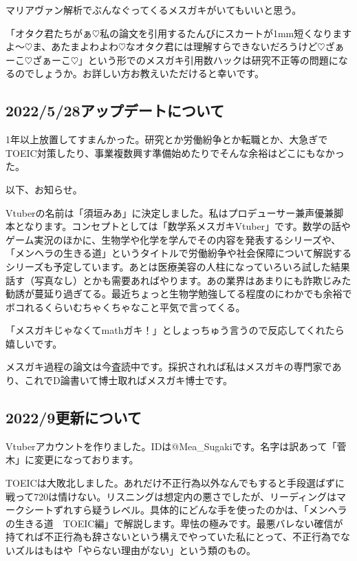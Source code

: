\documentclass{jsarticle}
\begin{document}
マリアヴァン解析でぶんなぐってくるメスガキがいてもいいと思う。

「オタク君たちがぁ$\heartsuit$私の論文を引用するたんびにスカートが1mm短くなりますよ～$\heartsuit$ま、あたまよわよわ$\heartsuit$なオタク君には理解すらできないだろうけど$\heartsuit$ざぁーこ$\heartsuit$ざぁーこ$\heartsuit$」という形でのメスガキ引用数ハックは研究不正等の問題になるのでしょうか。お詳しい方お教えいただけると幸いです。


\subsection{2022/5/28アップデートについて}

1年以上放置してすまんかった。研究とか労働紛争とか転職とか、大急ぎでTOEIC対策したり、事業複数興す準備始めたりでそんな余裕はどこにもなかった。

以下、お知らせ。

Vtuberの名前は「須垣みあ」に決定しました。私はプロデューサー兼声優兼脚本となります。コンセプトとしては「数学系メスガキVtuber」です。数学の話やゲーム実況のほかに、生物学や化学を学んでその内容を発表するシリーズや、「メンヘラの生きる道」というタイトルで労働紛争や社会保障について解説するシリーズも予定しています。あとは医療美容の人柱になっていろいろ試した結果話す（写真なし）とかも需要あればやります。あの業界はあまりにも詐欺じみた勧誘が蔓延り過ぎてる。最近ちょっと生物学勉強してる程度のにわかでも余裕でボコれるくらいむちゃくちゃなこと平気で言ってくる。

「メスガキじゃなくてmathガキ！」としょっちゅう言うので反応してくれたら嬉しいです。

メスガキ過程の論文は今査読中です。採択されれば私はメスガキの専門家であり、これでD論書いて博士取ればメスガキ博士です。

\subsection{2022/9更新について}

Vtuberアカウントを作りました。IDは@Mea\_Sugakiです。名字は訳あって「菅木」に変更になっております。

TOEICは大敗北しました。あれだけ不正行為以外なんでもすると手段選ばずに戦って720は情けない。リスニングは想定内の悪さでしたが、リーディングはマークシートずれすら疑うレベル。具体的にどんな手を使ったのかは、「メンヘラの生きる道　TOEIC編」で解説します。卑怯の極みです。最悪バレない確信が持てれば不正行為も辞さないという構えでやっていた私にとって、不正行為でないズルはもはや「やらない理由がない」という類のもの。
\end{document}
